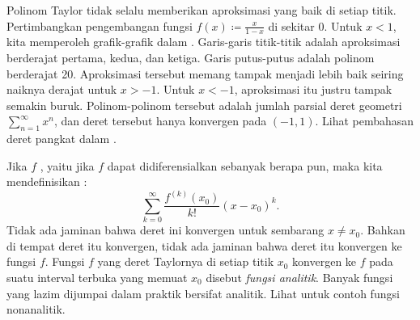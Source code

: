 Polinom Taylor tidak selalu memberikan aproksimasi yang baik
di setiap titik.
Pertimbangkan pengembangan fungsi
$f(x) \coloneqq \frac{x}{1-x}$ di sekitar 0.
Untuk $x < 1$, kita memperoleh grafik-grafik dalam
.  Garis-garis titik-titik adalah aproksimasi berderajat
pertama, kedua, dan ketiga.
Garis putus-putus adalah polinom berderajat 20.
Aproksimasi tersebut memang tampak menjadi
lebih baik seiring naiknya derajat untuk $x > -1$.
Untuk $x < -1$, aproksimasi itu justru tampak semakin buruk.
Polinom-polinom tersebut
adalah jumlah parsial deret geometri $\sum_{n=1}^\infty x^n$,
dan deret tersebut hanya konvergen pada $(-1,1)$.
Lihat pembahasan deret pangkat dalam
.

\begin{myfigureht}
\caption{Fungsi $\frac{x}{1-x}$, polinom Taylor
$P_1^0$, $P_2^0$, $P_3^0$ (semuanya bergaris titik-titik), dan polinom $P_{20}^0$
(bergaris putus-putus).\label{fig:taylorgeom}}
\end{myfigureht}

Jika $f$ \emph{},
yaitu jika $f$ dapat
didiferensialkan sebanyak berapa pun, maka 
kita mendefinisikan \emph{}:
\begin{equation*}
\sum_{k=0}^\infty
\frac{f^{(k)}(x_0)}{k!}{(x-x_0)}^k .
\end{equation*}
Tidak ada jaminan bahwa deret ini konvergen untuk sembarang
$x \neq x_0$.  Bahkan di tempat deret itu konvergen, tidak ada jaminan
bahwa deret itu konvergen ke fungsi $f$.  Fungsi $f$
yang deret Taylornya di setiap titik $x_0$
konvergen ke $f$ pada suatu interval terbuka yang memuat $x_0$
disebut
\emph{fungsi analitik}.
Banyak fungsi yang lazim dijumpai dalam praktik bersifat analitik.
Lihat  untuk contoh fungsi
nonanalitik.

